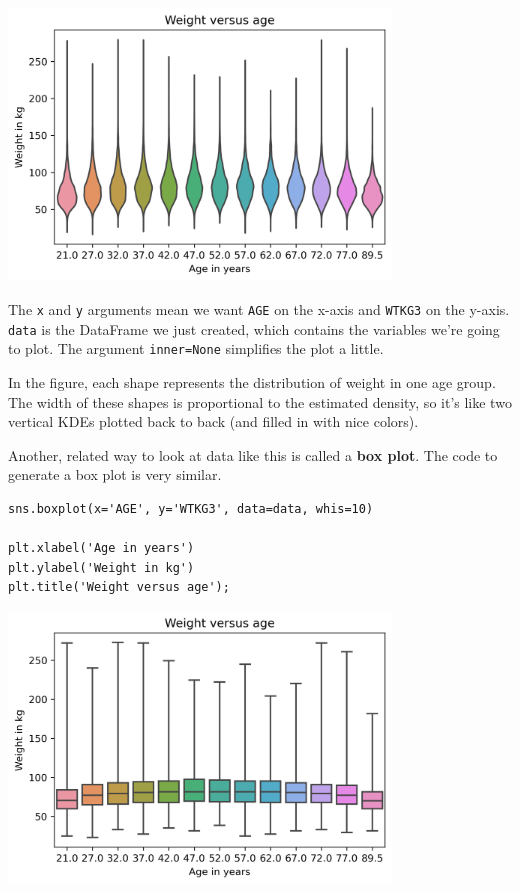 \begin{center}
\includegraphics[width=4in]{09_relationships_files/09_relationships_43_0.png}
\end{center}

The \passthrough{\lstinline!x!} and \passthrough{\lstinline!y!}
arguments mean we want \passthrough{\lstinline!AGE!} on the x-axis and
\passthrough{\lstinline!WTKG3!} on the y-axis.
\passthrough{\lstinline!data!} is the DataFrame we just created, which
contains the variables we're going to plot. The argument
\passthrough{\lstinline!inner=None!} simplifies the plot a little.

In the figure, each shape represents the distribution of weight in one
age group. The width of these shapes is proportional to the estimated
density, so it's like two vertical KDEs plotted back to back (and filled
in with nice colors).

Another, related way to look at data like this is called a \textbf{box
plot}. The code to generate a box plot is very similar.

\begin{lstlisting}[]
sns.boxplot(x='AGE', y='WTKG3', data=data, whis=10)

plt.xlabel('Age in years')
plt.ylabel('Weight in kg')
plt.title('Weight versus age');
\end{lstlisting}

\begin{center}
\includegraphics[width=4in]{09_relationships_files/09_relationships_45_0.png}
\end{center}

